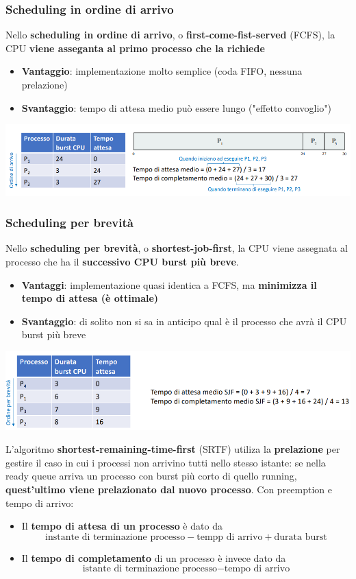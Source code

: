 \documentclass[12pt]{article}
\begin{document}
\subsubsection{Scheduling in ordine di arrivo}
Nello \textbf{scheduling in ordine di arrivo}, o \textbf{first-come-fist-served} (FCFS), la CPU \textbf{viene asseganta al primo processo che la richiede}
\begin{itemize}
    \item \textbf{Vantaggio}: implementazione molto semplice (coda FIFO, nessuna prelazione)
    \item \textbf{Svantaggio}: tempo di attesa medio può essere lungo ("effetto convoglio")
\end{itemize}
\begin{center}
    \includegraphics[width = 1\linewidth]{Images/45.png}
\end{center}
\subsubsection{Scheduling per brevità}
Nello \textbf{scheduling per brevità}, o \textbf{shortest-job-first}, la CPU viene assegnata al processo che ha il \textbf{successivo CPU burst più breve}.
\begin{itemize}
    \item \textbf{Vantaggi}: implementazione quasi identica a FCFS, ma \textbf{minimizza il tempo di attesa (è ottimale)}
    \item \textbf{Svantaggio}: di solito non si sa in anticipo qual è il processo che avrà il CPU burst più breve
\end{itemize}
\begin{center}
    \includegraphics[width = 0.90\linewidth]{Images/46.png}
\end{center}
L'algoritmo \textbf{shortest-remaining-time-first} (SRTF) utiliza la \textbf{prelazione} per gestire il caso in cui i processi non arrivino tutti nello stesso istante:
se nella ready queue arriva un processo con burst più corto di quello running, \textbf{quest'ultimo viene prelazionato dal nuovo processo}. Con preemption e tempo di arrivo:
\begin{itemize}
    \item Il \textbf{tempo di attesa di un processo} è dato da
    $$\textrm{instante di terminazione processo} - \textrm{tempp di arrivo} + \textrm{durata burst}$$
    \item Il \textbf{tempo di completamento} di un processo è invece dato da
    $$\textrm{istante di terminazione processo} - \textrm{tempo di arrivo}$$
\end{itemize}
\end{document}
